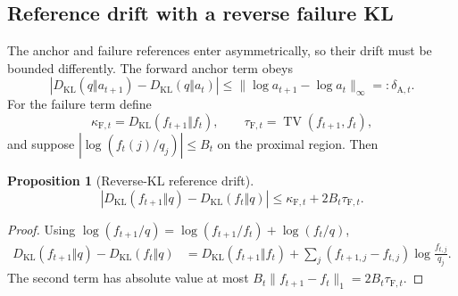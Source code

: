 \documentclass{article}
\newcommand{\KL}{D_{\mathrm{KL}}}
\newtheorem{proposition}{Proposition}
\begin{document}
\subsection{Reference drift with a reverse failure KL}
The anchor and failure references enter asymmetrically, so their drift must be bounded differently. The forward anchor term obeys
\begin{equation}
\left|\KL(q\Vert a_{t+1})-\KL(q\Vert a_t)\right|
\le \|\log a_{t+1}-\log a_t\|_\infty=:\delta_{\mathrm A,t}.
\end{equation}
For the failure term define
\begin{equation}
\kappa_{\mathrm F,t}=\KL(f_{t+1}\Vert f_t),\qquad
\tau_{\mathrm F,t}=\operatorname{TV}(f_{t+1},f_t),
\end{equation}
and suppose $|\log(f_t(j)/q_j)|\le B_t$ on the proximal region. Then
\begin{proposition}[Reverse-KL reference drift]
\label{prop:reverse_ref_drift}
\begin{equation}
\left|\KL(f_{t+1}\Vert q)-\KL(f_t\Vert q)\right|
\le \kappa_{\mathrm F,t}+2B_t\tau_{\mathrm F,t}.
\label{eq:reverse_ref_drift}
\end{equation}
\end{proposition}
\begin{proof}
Using $\log(f_{t+1}/q)=\log(f_{t+1}/f_t)+\log(f_t/q)$,
\begin{align}
\KL(f_{t+1}\Vert q)-\KL(f_t\Vert q)
&=\KL(f_{t+1}\Vert f_t)
+\sum_j(f_{t+1,j}-f_{t,j})\log\frac{f_{t,j}}{q_j}.
\end{align}
The second term has absolute value at most $B_t\|f_{t+1}-f_t\|_1=2B_t\tau_{\mathrm F,t}$.
\end{proof}
\end{document}
